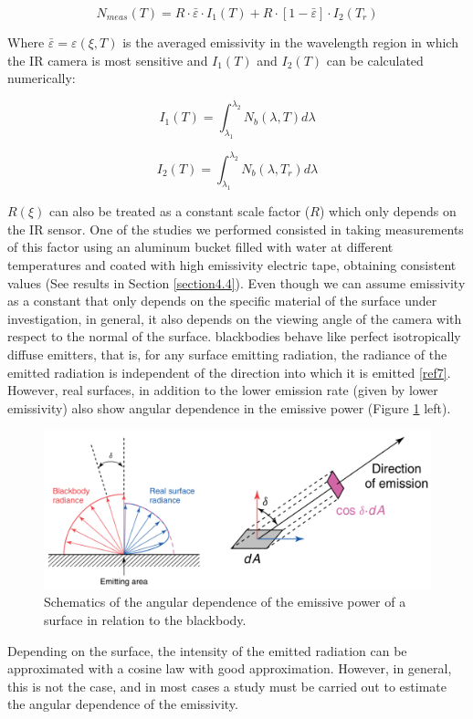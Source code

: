 		\begin{equation}\label{eq1.16}
			N_{meas}(T)= R \cdot \bar{\varepsilon} \cdot I_{1}(T) + R \cdot [1- \bar{\varepsilon}] \cdot I_{2}(T_{r})
		\end{equation}\bigskip
		
		Where $\bar{\varepsilon}=\varepsilon(\xi,T)$ is the averaged emissivity in the wavelength region in which the IR camera is most sensitive and $I_{1}(T)$ and $I_{2}(T)$ can be calculated numerically:
		
		\begin{equation}\label{eq3.10}
			I_{1}(T)=\int_{\lambda_{1}}^{\lambda_{2}} N_{b}(\lambda,T) d\lambda
		\end{equation}
		
		\begin{equation}\label{eq3.11}
			I_{2}(T)=\int_{\lambda_{1}}^{\lambda_{2}} N_{b}(\lambda,T_{r}) d\lambda
		\end{equation}\bigskip
		
		$R(\xi)$ can also be treated as a constant scale factor ($R$) which only depends on the IR sensor. One of the studies we performed consisted in taking measurements of this factor using an aluminum bucket filled with water at different temperatures and coated with high emissivity electric tape, obtaining consistent values (See results in Section \ref{section4.4}).
		Even though we can assume emissivity as a constant that only depends on the specific material of the surface under investigation, in general, it also depends on the viewing angle of the camera with respect to the normal of the surface. blackbodies behave like perfect isotropically diffuse emitters, that is, for any surface emitting radiation, the radiance of the emitted radiation is independent of the direction into which it is emitted \ref{ref7}. However, real surfaces, in addition to the lower emission rate (given by lower emissivity) also show angular dependence in the emissive power (Figure \ref{fig1.7} left).
		
		\begin{figure}[ht!]
			\centering
			\captionsetup{justification=centering,margin=2cm}
			\includegraphics[scale=0.35]{Figures/Chapter01/AngularDistributionSchematics.pdf}
			\caption{Schematics of the angular dependence of the emissive power of a surface in relation to the blackbody.}\label{fig1.7}
		\end{figure}
		
		Depending on the surface, the intensity of the emitted radiation can be approximated with a cosine law with good approximation. However, in general, this is not the case, and in most cases a study must be carried out to estimate the angular dependence of the emissivity.
		